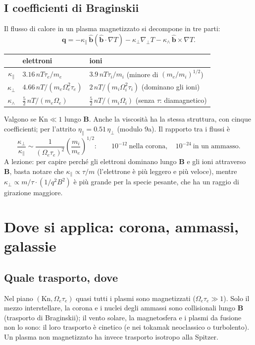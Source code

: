 \subsection{I coefficienti di Braginskii}
Il flusso di calore in un plasma magnetizzato si decompone in tre parti:
\begin{equation}
\mathbf{q}=-\kappa_\parallel\,\hat{\mathbf{b}}(\hat{\mathbf{b}}\cdot\nabla T)-\kappa_\perp\nabla_\perp T-\kappa_\wedge\,\hat{\mathbf{b}}\times\nabla T .
\end{equation}
\begin{center}
\small
\begin{tabular}{|c|l|l|}
\hline
 & elettroni & ioni\\
\hline
$\kappa_\parallel$ & $3.16\,nT\tau_e/m_e$ & $3.9\,nT\tau_i/m_i$ (minore di $(m_e/m_i)^{1/2}$)\\
\hline
$\kappa_\perp$ & $4.66\,nT/(m_e\Omega_e^2\tau_e)$ & $2\,nT/(m_i\Omega_i^2\tau_i)$ (dominano gli ioni)\\
\hline
$\kappa_\wedge$ & $\frac52\,nT/(m_e\Omega_e)$ & $\frac52\,nT/(m_i\Omega_i)$ (senza $\tau$: diamagnetico)\\
\hline
\end{tabular}
\end{center}
Valgono se $\mathrm{Kn}\ll1$ lungo $\mathbf{B}$. Anche la viscosità ha la stessa struttura, con cinque coefficienti; per l'attrito $\eta_\parallel=0.51\,\eta_\perp$ (modulo 9a). Il rapporto tra i flussi è
\begin{equation}
\frac{\kappa_\perp}{\kappa_\parallel}\sim\frac{1}{(\Omega_e\tau_e)^2}\left(\frac{m_i}{m_e}\right)^{1/2}:\qquad10^{-12}\ \text{nella corona},\quad10^{-24}\ \text{in un ammasso}.
\end{equation}
A lezione: per capire perché gli elettroni dominano lungo $\mathbf{B}$ e gli ioni attraverso $\mathbf{B}$, basta notare che $\kappa_\parallel\propto\tau/m$ (l'elettrone è più leggero e più veloce), mentre $\kappa_\perp\propto m/\tau\cdot(1/q^2B^2)$ è più grande per la specie pesante, che ha un raggio di girazione maggiore.

\section{Dove si applica: corona, ammassi, galassie}
\subsection{Quale trasporto, dove}
Nel piano $(\mathrm{Kn},\Omega_e\tau_e)$ quasi tutti i plasmi sono magnetizzati ($\Omega_e\tau_e\gg1$). Solo il mezzo interstellare, la corona e i nuclei degli ammassi sono collisionali lungo $\mathbf{B}$ (trasporto di Braginskii); il vento solare, la magnetosfera e i plasmi da fusione non lo sono: il loro trasporto è cinetico (e nei tokamak neoclassico o turbolento). Un plasma non magnetizzato ha invece trasporto isotropo alla Spitzer.
